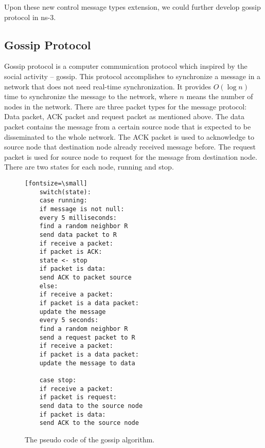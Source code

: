 Upon these new control message types extension, we could further develop gossip protocol in ns-3.

\subsection{Gossip Protocol}

Gossip protocol is a computer communication protocol which inspired by the social activity -- gossip. This protocol accomplishes to synchronize a message in a network that does not need real-time synchronization. It provides $O(\log n)$ time to synchronize the message to the network, where $n$ means the number of nodes in the network. There are three packet types for the message protocol: Data packet, ACK packet and request packet as mentioned above. The data packet contains the message from a certain source node that is expected to be disseminated to the whole network. The ACK packet is used to acknowledge to source node that destination node already received message before. The request packet is used for source node to request for the message from destination node. There are two states for each node, running and stop.

\begin{figure}
	\centering
	\begin{verbatim}[fontsize=\small]
	switch(state):
	case running:
	if message is not null:
	every 5 milliseconds:
	find a random neighbor R
	send data packet to R
	if receive a packet:
	if packet is ACK:
	state <- stop
	if packet is data:
	send ACK to packet source
	else:
	if receive a packet:
	if packet is a data packet:
	update the message
	every 5 seconds:
	find a random neighbor R
	send a request packet to R
	if receive a packet:
	if packet is a data packet:
	update the message to data
	
	case stop:
	if receive a packet:
	if packet is request:
	send data to the source node
	if packet is data:
	send ACK to the source node
	\end{verbatim}
	\caption{The pseudo code of the gossip algorithm.}
	\label{fig:pseudo}
\end{figure}


